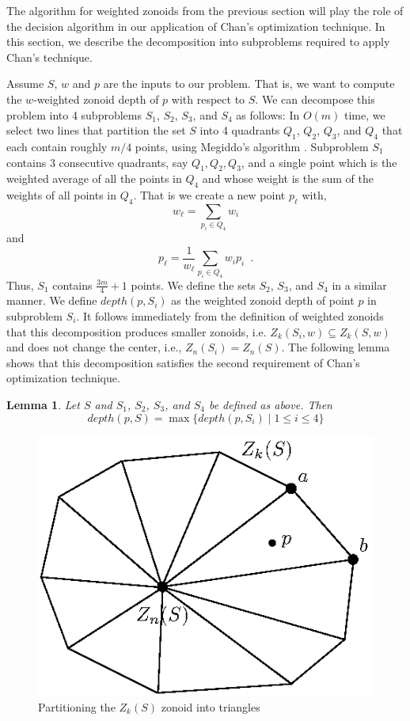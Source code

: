 \documentclass{elsart}
\newtheorem{lemma}{Lemma}
\begin{document}
The algorithm for weighted zonoids from the previous section will play
the role of the decision algorithm in our application of Chan's
optimization technique.  In this section, we describe the
decomposition into subproblems required to apply Chan's technique.

Assume $S$, $w$ and $p$ are the inputs to our problem.  That is, we
want to compute the $w$-weighted zonoid depth of $p$ with respect to
$S$.   We can decompose this problem into 4 subproblems $S_1$, $S_2$,
$S_3$, and $S_4$ as follows: In $O(m)$ time, we select two lines that
partition the set $S$ into 4 quadrants $Q_1$, $Q_2$, $Q_3$, and $Q_4$
that each contain roughly $m/4$ points, using Megiddo's algorithm
\cite{partitioning_with_two_lines_in_the_plane}. Subproblem $S_1$
contains 3 consecutive quadrants, say $Q_1, Q_2, Q_3$, and a single
point which is the weighted average of all the points in $Q_4$ and
whose weight is the sum of the weights of all points in $Q_4$.  That
is we create a new point $p_\ell$ with, 
\[
     w_\ell = \sum_{p_i\in Q_4} w_i
\]
and
\[
     p_\ell = \frac{1}{w_\ell}\sum_{p_i\in Q_4} w_ip_i \enspace .
\]
Thus, $S_1$ contains $\frac{3m}{4}+1$ points. We define the sets
$S_2$, $S_3$, and $S_4$ in a similar manner.  We define $depth(p,S_i)$
as the weighted zonoid depth of point $p$ in subproblem $S_i$. It follows
immediately from the definition of weighted zonoids that 
this decomposition produces smaller zonoids, i.e.
$Z_k(S_i,w) \subseteq Z_k(S,w)$ and does not change the center, i.e.,
$Z_n(S_i)=Z_n(S)$.  The following lemma shows that this
decomposition satisfies the second requirement of Chan's optimization
technique.

\begin{lemma}\label{lemma_final} Let $S$ and $S_1$, $S_2$, $S_3$, and
$S_4$ be defined as above.  Then
\[ depth(p,S) = \max\{depth(p,S_i) \mid 1 \le i \le 4\} \]
\end{lemma}

\begin{figure}
 \begin{center}
   \includegraphics{fig7}
   \caption{\label{fig_for_proof}Partitioning the $Z_k(S)$ zonoid into triangles}
 \end{center}
\end{figure}
\end{document}
